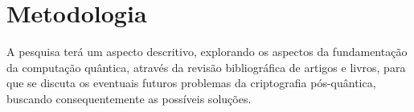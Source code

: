 \documentclass[
	12pt,				%
	oneside,			%
	a4paper,			%
	english,			%
	french,				%
	spanish,			%
	brazil,				%
	]{abntex2}
\begin{document}
\chapter{Metodologia}
A pesquisa terá um aspecto descritivo, explorando os aspectos da fundamentação da computação quântica, através da revisão bibliográfica de artigos e livros, para que se discuta os eventuais futuros problemas da criptografia pós-quântica, buscando consequentemente as possíveis soluções. 




\postextual






\end{document}
